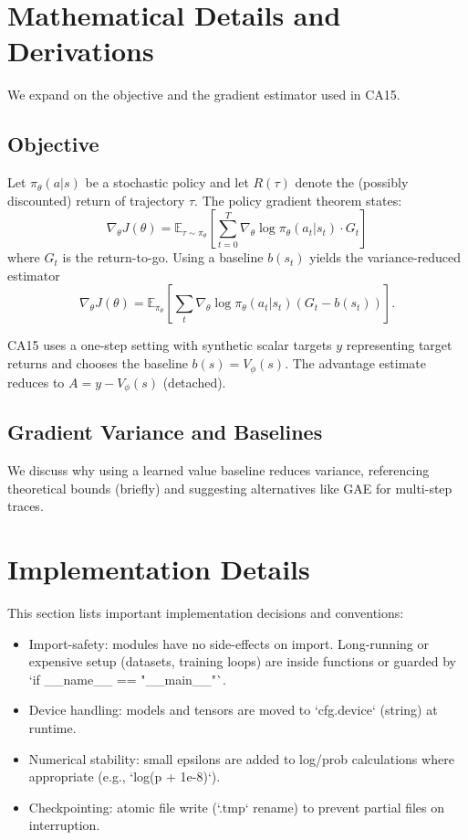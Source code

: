 \documentclass[11pt,a4paper]{article}
\begin{document}
\section{Mathematical Details and Derivations}
We expand on the objective and the gradient estimator used in CA15.

\subsection{Objective}
Let $\pi_\theta(a|s)$ be a stochastic policy and let $R(\tau)$ denote the (possibly discounted) return of trajectory $\tau$. The policy gradient theorem states:
\begin{equation}
\nabla_\theta J(\theta) = \mathbb{E}_{\tau\sim\pi_\theta} \left[ \sum_{t=0}^{T} \nabla_\theta \log \pi_\theta(a_t|s_t) \cdot G_t \right]
\end{equation}
where $G_t$ is the return-to-go. Using a baseline $b(s_t)$ yields the variance-reduced estimator
\begin{equation}
\nabla_\theta J(\theta) = \mathbb{E}_{\pi_\theta} \left[ \sum_t \nabla_\theta \log\pi_\theta(a_t|s_t) (G_t - b(s_t)) \right].
\end{equation}

CA15 uses a one-step setting with synthetic scalar targets $y$ representing target returns and chooses the baseline $b(s)=V_\phi(s)$. The advantage estimate reduces to $A = y - V_\phi(s)$ (detached).

\subsection{Gradient Variance and Baselines}
We discuss why using a learned value baseline reduces variance, referencing theoretical bounds (briefly) and suggesting alternatives like GAE \cite{schulman2016high} for multi-step traces.

\section{Implementation Details}
This section lists important implementation decisions and conventions:
\begin{itemize}
  \item Import-safety: modules have no side-effects on import. Long-running or expensive setup (datasets, training loops) are inside functions or guarded by `if __name__ == "__main__"`.
  \item Device handling: models and tensors are moved to `cfg.device` (string) at runtime.
  \item Numerical stability: small epsilons are added to log/prob calculations where appropriate (e.g., `log(p + 1e-8)`).
  \item Checkpointing: atomic file write (`.tmp` rename) to prevent partial files on interruption.
\end{itemize}
\end{document}
